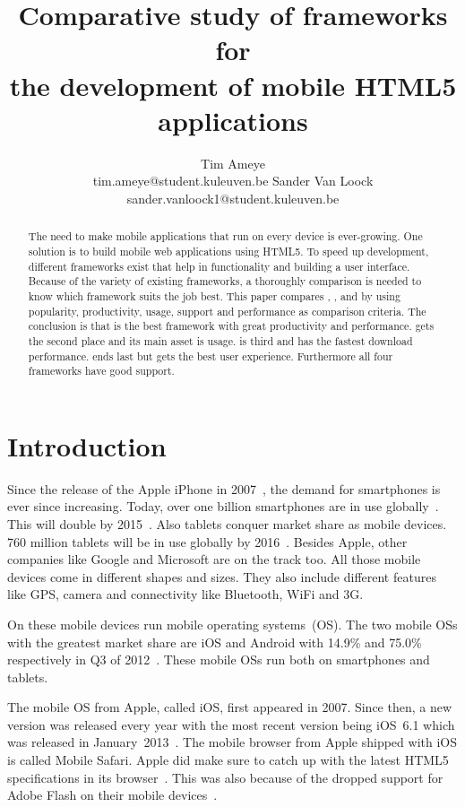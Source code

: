 \documentclass[a4paper]{artikel3}
\title{Comparative study of frameworks for \\ the development of mobile HTML5 applications}
\author{Tim Ameye \\ tim.ameye@student.kuleuven.be \And Sander Van Loock \\ sander.vanloock1@student.kuleuven.be}
\begin{document}
\maketitle

\begin{abstract}
The need to make mobile applications that run on every device is ever-growing.
One solution is to build mobile web applications using HTML5.
To speed up development, different frameworks exist that help in functionality and building a user interface.
Because of the variety of existing frameworks, a thoroughly comparison is needed to know which framework suits the job best.
This paper compares \st{}, \jqm{}, \kendo{} and \lungo{} by using popularity, productivity, usage, support and performance as comparison criteria. 
The conclusion is that \jqm{} is the best framework with great productivity and performance. 
\kendo{} gets the second place and its main asset is usage.
\lungo{} is third and has the fastest download performance.
\st{} ends last but gets the best user experience.
Furthermore all four frameworks have good support.
\end{abstract}


\section{Introduction} %
\label{sec:introduction}
Since the release of the Apple iPhone in 2007~\cite{David2011}, the demand for smartphones is ever since increasing. 
Today, over one billion smartphones are in use globally~\cite{Yang2012}.
This will double by 2015~\cite{Gillett2012}.
Also tablets conquer market share as mobile devices.
760 million tablets will be in use globally by 2016~\cite{Gillett2012}.
Besides Apple, other companies like Google and Microsoft are on the track too.
All those mobile devices come in different shapes and sizes.
They also include different features like GPS, camera and connectivity like Bluetooth, WiFi and 3G.

On these mobile devices run mobile operating systems~(OS). The two mobile OSs with the greatest market share are iOS and Android with 14.9\% and 75.0\% respectively in Q3 of 2012~\cite{Protalinski2012}.
These mobile OSs run both on smartphones and tablets.

The mobile OS from Apple, called iOS, first appeared in 2007.
Since then, a new version was released every year with the most recent version being iOS~6.1 which was released in January~2013~\cite{Deitel2012,PhilDutson2012,Apple2013}.
The mobile browser from Apple shipped with iOS is called Mobile Safari.
Apple did make sure to catch up with the latest HTML5 specifications in its browser~\cite{Hales2012}.
This was also because of the dropped support for Adobe Flash on their mobile devices~\cite{Jobs2010}.
\end{document}
